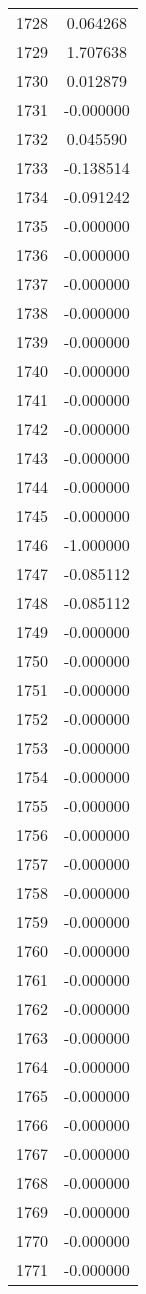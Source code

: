\documentclass[12pt]{article}
\begin{document}
\begin{longtable}{@{}cc@{}}
1728 & 0.064268 \\
1729 & 1.707638 \\
1730 & 0.012879 \\
1731 & -0.000000 \\
1732 & 0.045590 \\
1733 & -0.138514 \\
1734 & -0.091242 \\
1735 & -0.000000 \\
1736 & -0.000000 \\
1737 & -0.000000 \\
1738 & -0.000000 \\
1739 & -0.000000 \\
1740 & -0.000000 \\
1741 & -0.000000 \\
1742 & -0.000000 \\
1743 & -0.000000 \\
1744 & -0.000000 \\
1745 & -0.000000 \\
1746 & -1.000000 \\
1747 & -0.085112 \\
1748 & -0.085112 \\
1749 & -0.000000 \\
1750 & -0.000000 \\
1751 & -0.000000 \\
1752 & -0.000000 \\
1753 & -0.000000 \\
1754 & -0.000000 \\
1755 & -0.000000 \\
1756 & -0.000000 \\
1757 & -0.000000 \\
1758 & -0.000000 \\
1759 & -0.000000 \\
1760 & -0.000000 \\
1761 & -0.000000 \\
1762 & -0.000000 \\
1763 & -0.000000 \\
1764 & -0.000000 \\
1765 & -0.000000 \\
1766 & -0.000000 \\
1767 & -0.000000 \\
1768 & -0.000000 \\
1769 & -0.000000 \\
1770 & -0.000000 \\
1771 & -0.000000 \\

\end{longtable}
\end{document}
